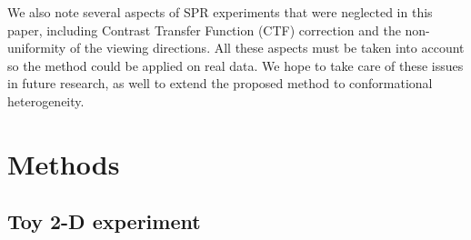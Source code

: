 \documentclass[english,11pt]{article}
\newcommand{\1}{\mathbf{1}}
\newcommand{\TODO}[1]{{\color{red}{[#1]}}}
\numberwithin{equation}{section}
\theoremstyle{plain}
\theoremstyle{definition}
\theoremstyle{remark}
\theoremstyle{plain}
\theoremstyle{remark}
\theoremstyle{plain}
\theoremstyle{plain}
\begin{document}
We also note several aspects of SPR experiments that were neglected in this paper, including Contrast Transfer Function (CTF) correction and the non-uniformity of the viewing directions. All these aspects must be taken into account so the method could be applied on real data. We hope to take care of these issues in future research, as well to extend the proposed method to conformational heterogeneity. 
\TODO{another issue is that micrographs also contain contaminants such as carbon, ice crystals, etc.. }
%

\TODO{Where and how do we cite Kam? Fred?}

\section{Methods} \label{sec:methods}

\subsection{Toy 2-D experiment}
\end{document}
